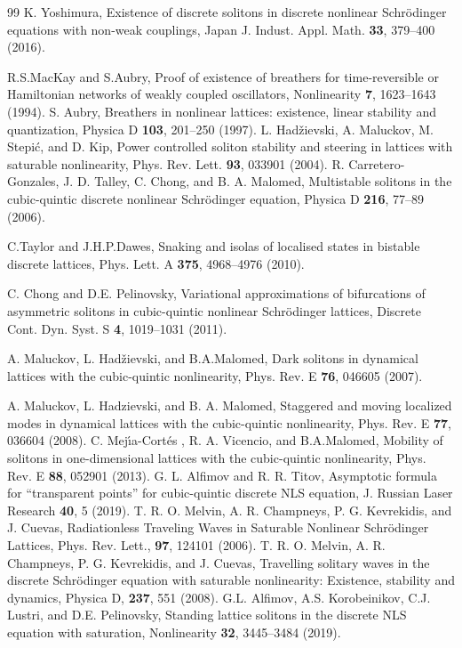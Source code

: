 \documentclass[12pt,reqno]{amsart}
\begin{document}
\begin{thebibliography}{99}
 K. Yoshimura, Existence of discrete solitons in discrete nonlinear Schr\"odinger equations with non-weak couplings, Japan J. Indust. Appl. Math. {\bf 33}, 379--400 (2016).

 R.S.MacKay and S.Aubry, Proof of existence of breathers for time-reversible or Hamiltonian networks of weakly coupled oscillators, Nonlinearity {\bf 7}, 1623--1643 (1994).
%
 S. Aubry, Breathers in nonlinear lattices: existence, linear stability and quantization, Physica D {\bf 103},  201--250 (1997).
%
%
%
 L. Had\v{z}ievski, A. Maluckov, M. Stepi\'{c}, and D. Kip, Power controlled soliton stability and steering in lattices with saturable nonlinearity, Phys. Rev. Lett. {\bf 93}, 033901 (2004).
%
 R. Carretero-Gonzales, J. D. Talley, C. Chong, and B. A. Malomed, Multistable solitons in the cubic-quintic discrete nonlinear Schr\"odinger equation, Physica D {\bf 216}, 77--89 (2006).

 C.Taylor and J.H.P.Dawes, Snaking and isolas of localised states in bistable discrete lattices, Phys. Lett. A {\bf 375}, 4968--4976 (2010).

 C. Chong and D.E. Pelinovsky, Variational approximations of bifurcations of asymmetric solitons in cubic-quintic nonlinear Schr\"{o}dinger lattices, Discrete Cont. Dyn. Syst. S {\bf 4}, 1019--1031  (2011).

 A. Maluckov, L. Had\v{z}ievski, and B.A.Malomed, Dark solitons in dynamical lattices with the cubic-quintic nonlinearity, Phys. Rev. E {\bf 76}, 046605 (2007).  

 A. Maluckov, L. Hadzievski, and B. A. Malomed, Staggered and moving localized modes in dynamical lattices with the cubic-quintic nonlinearity, Phys. Rev. E {\bf 77}, 036604 (2008).
%
 C. Mej\'{\i}a-Cort\'es ,  R. A. Vicencio, and B.A.Malomed, Mobility of solitons in one-dimensional lattices with the cubic-quintic nonlinearity, Phys. Rev. E {\bf 88}, 052901 (2013).
%
 G. L. Alfimov and R. R. Titov, Asymptotic formula for ``transparent points'' for cubic-quintic discrete NLS equation, J. Russian Laser Research {\bf 40}, 5 (2019).
%
 T. R. O. Melvin, A. R. Champneys, P. G. Kevrekidis, and J. Cuevas, Radiationless Traveling Waves in Saturable Nonlinear Schr\"odinger Lattices, Phys. Rev. Lett., {\bf 97}, 124101 (2006).
%
 T. R. O. Melvin, A. R. Champneys, P. G. Kevrekidis, and J. Cuevas, Travelling solitary waves in the discrete Schr\"odinger equation with saturable nonlinearity: Existence, stability and dynamics, Physica D, {\bf 237}, 551 (2008).
%
 G.L. Alfimov, A.S. Korobeinikov, C.J. Lustri, and D.E. Pelinovsky, Standing lattice solitons in the discrete NLS equation with saturation, Nonlinearity {\bf 32}, 3445--3484  (2019).


\end{thebibliography}
\end{document}
